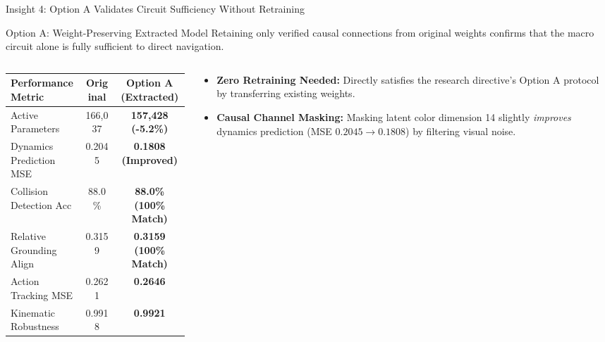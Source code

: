 \documentclass[aspectratio=169, 10pt]{beamer}
\begin{document}
\begin{frame}{Insight 4: Option A Validates Circuit Sufficiency Without Retraining}
  \begin{block}{Option A: Weight-Preserving Extracted Model}
    Retaining only verified causal connections from original weights confirms that the macro circuit alone is fully sufficient to direct navigation.
  \end{block}
  \vspace{-0.2cm}
  \begin{columns}[T]
    \begin{column}{0.50\textwidth}
      \setlength{\tabcolsep}{3pt}
      \begin{table}
        \centering
        \scriptsize
        \begin{tabular}{lcc}
          \toprule
          \textbf{Performance Metric} & \textbf{Original} & \textbf{Option A (Extracted)} \\
          \midrule
          Active Parameters & 166,037 & \textbf{157,428 (-5.2\%)} \\
          Dynamics Prediction MSE & 0.2045 & \textbf{0.1808 (Improved)} \\
          Collision Detection Acc & 88.0\% & \textbf{88.0\% (100\% Match)} \\
          Relative Grounding Align & 0.3159 & \textbf{0.3159 (100\% Match)} \\
          Action Tracking MSE & 0.2621 & \textbf{0.2646} \\
          Kinematic Robustness & 0.9918 & \textbf{0.9921} \\
          \bottomrule
        \end{tabular}
      \end{table}
    \end{column}
    \begin{column}{0.46\textwidth}
      \begin{itemize}
        \item \textbf{Zero Retraining Needed:} Directly satisfies the research directive's Option A protocol by transferring existing weights.
        \item \textbf{Causal Channel Masking:} Masking latent color dimension 14 slightly \emph{improves} dynamics prediction (MSE $0.2045 \to 0.1808$) by filtering visual noise.
      \end{itemize}
    \end{column}
  \end{columns}
\end{frame}
\end{document}
